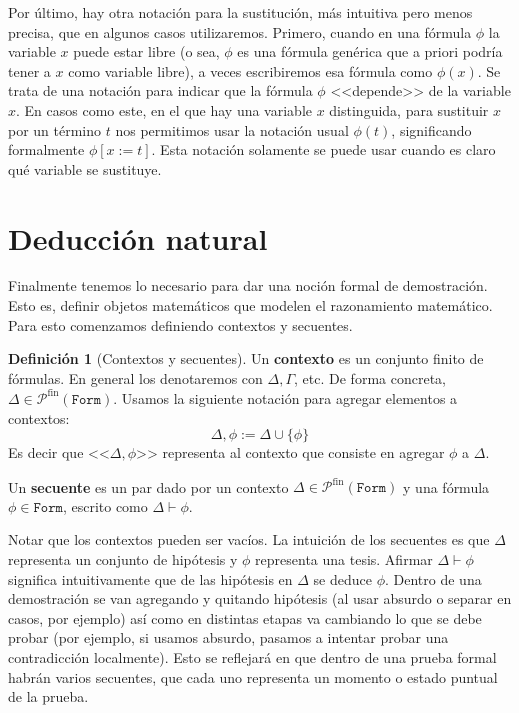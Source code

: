 \documentclass[a4paper, 12pt]{report}
\newcommand{\te}{\text}
\theoremstyle{definition}
\newtheorem{definicion}[teorema]{Definición}
\begin{document}
Por último, hay otra notación para la sustitución, más intuitiva pero menos precisa, que en algunos casos utilizaremos. Primero, cuando en una fórmula $\phi$ la variable $x$ puede estar libre (o sea, $\phi$ es una fórmula genérica que a priori podría tener a $x$ como variable libre), a veces escribiremos esa fórmula como $\phi(x)$. Se trata de una notación para indicar que la fórmula $\phi$ <<depende>> de la variable $x$. En casos como este, en el que hay una variable $x$ distinguida, para sustituir $x$ por un término $t$ nos permitimos usar la notación usual $\phi(t)$, significando formalmente $\phi[x:=t]$. Esta notación solamente se puede usar cuando es claro qué variable se sustituye.

\section{Deducción natural}

Finalmente tenemos lo necesario para dar una noción formal de demostración. Esto es, definir objetos matemáticos que modelen el razonamiento matemático. Para esto comenzamos definiendo contextos y secuentes.

\begin{definicion}[Contextos y secuentes]
	Un \textbf{contexto} es un conjunto finito de fórmulas. En general los denotaremos con $\Delta,\Gamma$, etc. De forma concreta, $\Delta\in\mathcal{P}^{\te{fin}}(\mathtt{Form})$. Usamos la siguiente notación para agregar elementos a contextos:
	$$ \Delta,\phi:= \Delta\cup\{\phi\} $$
	Es decir que  <<$\Delta,\phi$>> representa al contexto que consiste en agregar $\phi$ a $\Delta$.
	
	Un \textbf{secuente} es un par dado por un contexto $\Delta\in\mathcal{P}^{\te{fin}}(\mathtt{Form})$ y una fórmula $\phi\in\mathtt{Form}$, escrito como $\Delta\vdash\phi$.
\end{definicion}

Notar que los contextos pueden ser vacíos. La intuición de los secuentes es que $\Delta$ representa un conjunto de hipótesis y $\phi$ representa una tesis. Afirmar $\Delta\vdash\phi$ significa intuitivamente que de las hipótesis en $\Delta$ se deduce $\phi$. Dentro de una demostración se van agregando y quitando hipótesis (al usar absurdo o separar en casos, por ejemplo) así como en distintas etapas va cambiando lo que se debe probar (por ejemplo, si usamos absurdo, pasamos a intentar probar una contradicción localmente). Esto se reflejará en que dentro de una prueba formal habrán varios secuentes, que cada uno representa un momento o estado puntual de la prueba.
\end{document}
